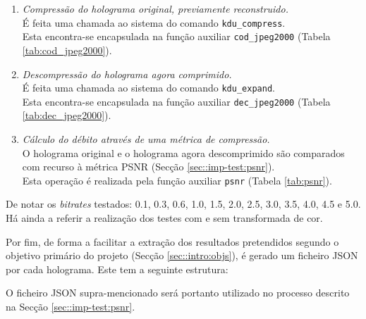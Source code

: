 \begin{enumerate}
    \item \textit{Compressão do holograma original, previamente reconstruido.} \\
        É feita uma chamada ao sistema do comando \verb|kdu_compress|.\\ Esta encontra-se encapsulada na função auxiliar \verb|cod_jpeg2000| (Tabela \ref{tab:cod_jpeg2000}).
    \item \textit{Descompressão do holograma agora comprimido.} \\
        É feita uma chamada ao sistema do comando \verb|kdu_expand|.\\ Esta encontra-se encapsulada na função auxiliar \verb|dec_jpeg2000| (Tabela \ref{tab:dec_jpeg2000}).
    \item \textit{Cálculo do débito através de uma métrica de compressão.} \\
        O holograma original e o holograma agora descomprimido são comparados com recurso à métrica \ac{PSNR} (Secção \ref{sec::imp-test:psnr}).\\ Esta operação é realizada pela função auxiliar \verb|psnr| (Tabela \ref{tab:psnr}).
\end{enumerate}

De notar os \textit{bitrates} testados: \SI{0.1}{}, \SI{0.3}{}, \SI{0.6}{}, \SI{1.0}{}, \SI{1.5}{}, \SI{2.0}{}, \SI{2.5}{}, \SI{3.0}{}, \SI{3.5}{}, \SI{4.0}{}, \SI{4.5}{} e \SI{5.0}{}. Há ainda a referir a realização dos testes com e sem transformada de cor.

Por fim, de forma a facilitar a extração dos resultados pretendidos segundo o objetivo primário do projeto (Secção \ref{sec::intro:objs}), é gerado um ficheiro \ac{JSON} por cada holograma. Este tem a seguinte estrutura:

\begin{figure}[!h]
\end{figure}

O ficheiro \ac{JSON} supra-mencionado será portanto utilizado no processo descrito na Secção \ref{sec::imp-test:psnr}.


